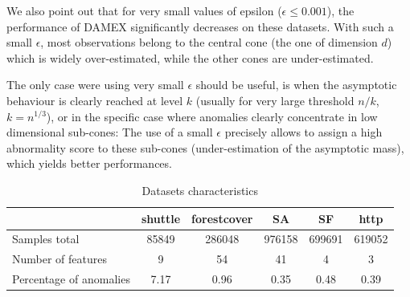 We also point out that for very small values of epsilon ($\epsilon \le 0.001$),
the performance of DAMEX significantly decreases on these datasets.
With such a small $\epsilon$, most observations belong to the central cone
(the one of dimension $d$) which is widely over-estimated, while the other cones are under-estimated.%

The only case were using very small $\epsilon$ should be useful, is when the asymptotic behaviour is
clearly reached at level $k$ (usually for very large threshold $n/k$, \eg~$k=n^{1/3}$), or in the
specific case where anomalies clearly concentrate in low dimensional sub-cones: The use of a small $\epsilon$ precisely allows
to assign a high abnormality score to these sub-cones (under-estimation of the asymptotic mass), which yields better performances.



\begin{table}[!ht]
\caption{Datasets characteristics}
\label{jmva:table:data}
\centering
\begin{tabular}{lccccc}
  \toprule
   ~                   & shuttle & forestcover & SA     & SF     & http    \\
  \midrule
  Samples total        & 85849   & 286048      & 976158 & 699691 & 619052  \\
  Number of features   & 9       & 54          & 41     & 4      & 3       \\
  Percentage of anomalies & 7.17    & 0.96        & 0.35   & 0.48   & 0.39 \\
\bottomrule
\end{tabular}
\end{table}

